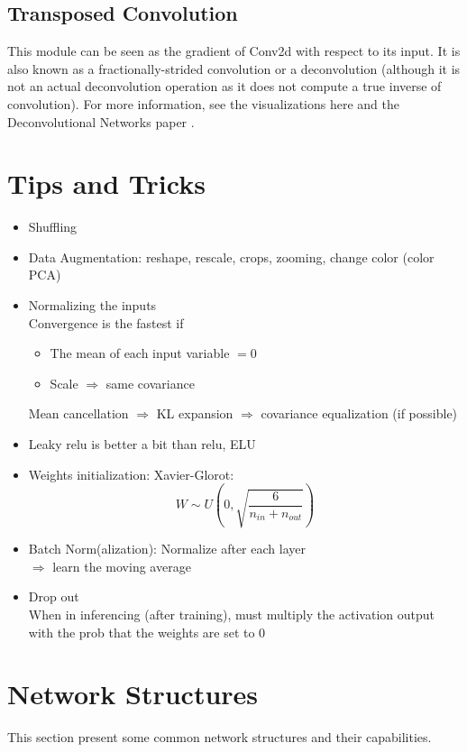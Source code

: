 \subsection{Transposed Convolution}
This module can be seen as the gradient of Conv2d with respect to its input. It is also known as a fractionally-strided convolution or a deconvolution (although it is not an actual deconvolution operation as it does not compute a true inverse of convolution). For more information, see the visualizations here \cite{dumoulin2016guide} and the Deconvolutional Networks paper \cite{zeiler2010deconvolutional}.

\section{Tips and Tricks}
\begin{itemize}
	\item Shuffling
	\item Data Augmentation: reshape, rescale, crops, zooming, change color (color \ac{PCA})
	\item Normalizing the inputs\\
	Convergence is the fastest if
	\begin{itemize}
		\item The mean of each input variable $=0$
		\item Scale $\Rightarrow$ same covariance
	\end{itemize}
	Mean cancellation $\Rightarrow$ \ac{KL} expansion $\Rightarrow$ covariance equalization (if possible)
	\item Leaky \ac{relu} is better a bit than \ac{relu}, ELU
	\item Weights initialization: Xavier-Glorot:
	\[ W \sim U\left(0, \sqrt{\frac{6}{n_{in} + n_{out}}}\right) \]
	\item Batch Norm(alization): Normalize after each layer\\
	$\Rightarrow$ learn the moving average
	\item Drop out\\
	\note When in inferencing (after training), must multiply the activation output with the \ac{prob} that the weights are set to 0
\end{itemize}

\section{Network Structures}
This section present some common network structures and their capabilities.

